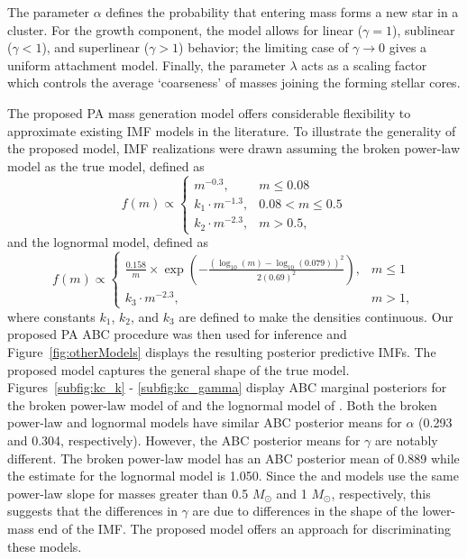 \documentclass[12pt]{article}
\newcommand{\Msun}{M_{\odot}}
\begin{document}
The parameter $\alpha$ defines the probability that entering mass forms a new star in a cluster.  For the growth component, the model allows for linear ($\gamma = 1$), sublinear ($\gamma < 1$), and superlinear ($\gamma > 1$) behavior; the limiting case of $\gamma \to 0$ gives a uniform attachment model.  Finally, the parameter $\lambda$ acts as a scaling factor which controls the average `coarseness' of masses joining the forming stellar cores. 

The proposed PA mass generation model offers considerable flexibility to approximate existing IMF models in the literature.  To illustrate the generality of the proposed model, IMF realizations were drawn assuming the \cite{kroupa2001} 
%
broken power-law model as the true model, defined as
\begin{equation}
f(m) \propto \left\{
  \begin{array}{lr}
   m^{-0.3}, &  m \leq 0.08 \\
   k_1 \cdot m^{-1.3}, &  0.08 < m \leq 0.5 \\
   k_2 \cdot m^{-2.3}, &  m > 0.5,
  \end{array}
\right. \label{eq:kroupa}
\end{equation}
%
and the \cite{Chabrier:2003om, Chabrier:2003oq} lognormal model, defined as
%
\begin{equation}
f(m) \propto \left\{
  \begin{array}{lr}
    \frac{0.158}{m} \times \exp \left ( -\frac{(\log_{10}(m) - \log_{10}(0.079))^2}{2(0.69)^2}\right), &  m \leq 1\\
   k_3 \cdot m^{-2.3}, &  m > 1,
  \end{array}
\right. \label{eq:chab}
\end{equation}
%
where constants $k_1$, $k_2$, and $k_3$ are defined to make the densities continuous.
%
Our proposed PA ABC procedure was then used for inference and Figure~\ref{fig:otherModels} displays the resulting posterior predictive IMFs.  The proposed model captures the general shape of the true model.  Figures~\ref{subfig:kc_k} - \ref{subfig:kc_gamma} display ABC marginal posteriors for the broken power-law model of \cite{kroupa2001} and the lognormal model of  \cite{Chabrier:2003om, Chabrier:2003oq}.  Both the broken power-law and lognormal models have similar ABC posterior means for $\alpha$ (0.293 and 0.304, respectively).  However, the ABC posterior means for $\gamma$ are notably different.  The broken power-law model has an ABC posterior mean of 0.889 while the estimate for the lognormal model is 1.050.  Since the  \cite{kroupa2001} and \cite{Chabrier:2003om, Chabrier:2003oq} models use the same power-law slope for masses greater than 0.5 $\Msun$ and 1 $\Msun$, respectively, this suggests that the differences in $\gamma$ are due to differences in the shape of the lower-mass end of the IMF.  The proposed model offers an approach for discriminating these models.
\end{document}
